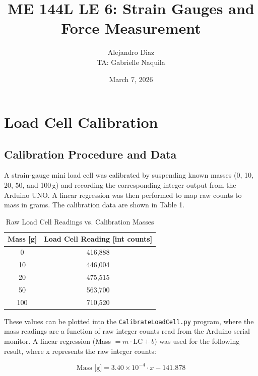 \documentclass{article}
\title{\textbf{ME 144L LE 6: Strain Gauges and Force Measurement}}
\author{Alejandro Diaz \\ TA: Gabrielle Naquila}
\date{March 7, 2026}
\begin{document}
\maketitle

\section{Load Cell Calibration}

\subsection{Calibration Procedure and Data}

A strain-gauge mini load cell was calibrated by suspending known masses (0, 10, 20, 50, and 100\,g) and recording the corresponding integer output from the Arduino UNO. A linear regression was then performed to map raw counts to mass in grams. The calibration data are shown in Table 1.

\begin{table}[H]
    \centering
    \caption{Raw Load Cell Readings vs. Calibration Masses}
    \label{tab:cal_data}
    \begin{tabular}{cc}
        \toprule
        \textbf{Mass [g]} & \textbf{Load Cell Reading [int counts]} \\
        \midrule
        0   & 416,888 \\
        10  & 446,004 \\
        20  & 475,515 \\
        50  & 563,700 \\
        100 & 710,520 \\
        \bottomrule
    \end{tabular}
\end{table}

\noindent These values can be plotted into the \texttt{CalibrateLoadCell.py} program, where the mass readings are a function of raw integer counts read from the Arduino serial monitor. A linear regression (Mass $= m \cdot \text{LC} + b$) was used for the following result, where x represents the raw integer counts:

\begin{equation}
    \text{Mass [g]} = 3.40 \times 10^{-4} \cdot x - 141.878
    \label{eq:cal_mass}
\end{equation} 
\end{document}
